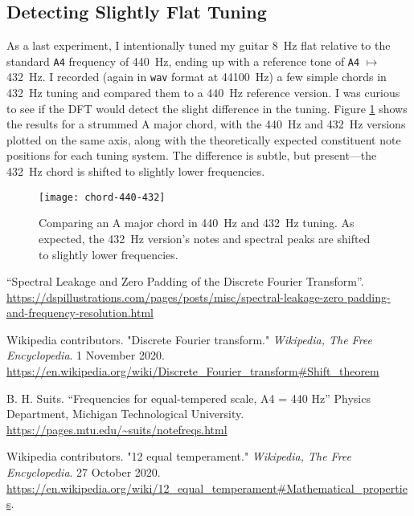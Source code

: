 \documentclass[11pt, a4paper]{article}
\begin{document}
\subsection{Detecting Slightly Flat Tuning}
As a last experiment, I intentionally tuned my guitar \SI{8}{\hertz} flat relative to the standard \texttt{A4} frequency of \SI{440}{\hertz}, ending up with a reference tone of \texttt{A4} $\mapsto$ \SI{432}{\hertz}. I recorded (again in \texttt{wav} format at \SI{44100}{\hertz}) a few simple chords in \SI{432}{\hertz} tuning and compared them to a \SI{440}{\hertz} reference version. I was curious to see if the DFT would detect the slight difference in the tuning. Figure \ref{dft:fig:chord-440-432} shows the results for a strummed A major chord, with the \SI{440}{\hertz} and \SI{432}{\hertz} versions plotted on the same axis, along with the theoretically expected constituent note positions for each tuning system. The difference is subtle, but present---the \SI{432}{\hertz} chord is shifted to slightly lower frequencies.


\begin{figure}[htb!]
\centering
\texttt{[image: chord-440-432]}
\vspace{-8mm}
\caption{Comparing an A major chord in \SI{440}{\hertz} and \SI{432}{\hertz} tuning. As expected, the \SI{432}{\hertz} version's notes and spectral peaks are shifted to slightly lower frequencies.}
\label{dft:fig:chord-440-432}
\end{figure}
 



\begin{thebibliography}{}
\setlength{\itemsep}{.2\itemsep}\setlength{\parsep}{.5\parsep}

 ``Spectral Leakage and Zero Padding of the Discrete Fourier Transform''. \url{https://dspillustrations.com/pages/posts/misc/spectral-leakage-zero padding-and-frequency-resolution.html}

 Wikipedia contributors. "Discrete Fourier transform." \textit{Wikipedia, The Free Encyclopedia}. 1 November 2020. \url{https://en.wikipedia.org/wiki/Discrete_Fourier_transform#Shift_theorem}


 B. H. Suits. ``Frequencies for equal-tempered scale, A4 = 440 Hz'' Physics Department, Michigan Technological University. \url{https://pages.mtu.edu/~suits/notefreqs.html}

 Wikipedia contributors. "12 equal temperament." \textit{Wikipedia, The Free Encyclopedia}. 27 October 2020. \url{https://en.wikipedia.org/wiki/12_equal_temperament#Mathematical_properties}.


\end{thebibliography}
\end{document}
